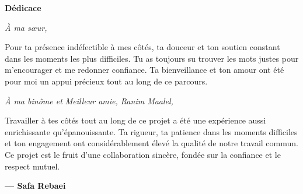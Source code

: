 \thispagestyle{plain}
\begin{center}
{\normalfont\fontsize{16}{20}\bfseries Dédicace}
\end{center}
\vspace{10pt}

\begin{center}
\begin{tcolorbox}[
  enhanced,
  breakable,
  colback=white,
  colframe=teal!70!black,
  boxrule=1.2pt,
  arc=4pt,
  left=1.5cm, right=1.5cm, top=1cm, bottom=1cm,
  width=0.85\textwidth
]

\begin{center}
\textit{À ma sœur,}
\end{center}

\vspace{6pt}

Pour ta présence indéfectible à mes côtés, ta douceur et ton soutien constant
dans les moments les plus difficiles. Tu as toujours su trouver les mots justes
pour m'encourager et me redonner confiance. Ta bienveillance et ton amour ont
été pour moi un appui précieux tout au long de ce parcours.

\vspace{12pt}

\begin{center}
\textit{À ma binôme et Meilleur amie, Ranim Maalel,}
\end{center}

\vspace{6pt}

Travailler à tes côtés tout au long de ce projet a été une expérience aussi
enrichissante qu'épanouissante. Ta rigueur, ta patience dans les moments
difficiles et ton engagement ont considérablement élevé la qualité de notre
travail commun. Ce projet est le fruit d'une collaboration sincère, fondée
sur la confiance et le respect mutuel.

\vspace{24pt}

\begin{flushright}
\textbf{— Safa Rebaei}
\end{flushright}

\end{tcolorbox}
\end{center}
